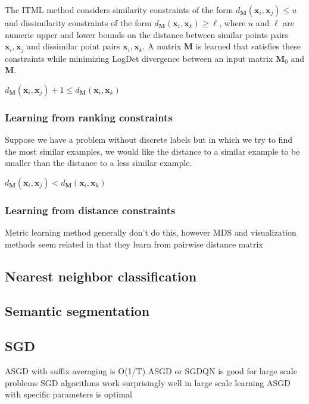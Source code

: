 \documentclass[a4paper,titlepage]{article}
\renewcommand{\vec}[1]{\mathbf{#1}}
\newcommand{\mat}[1]{\mathbf{#1}}
\begin{document}
The \acf{ITML} method \cite{davis2007information} considers similarity constraints of the form $d_{\mat{M}}(\vec{x}_{i}, \vec{x}_{j}) \leq u$ and dissimilarity constraints of the form $d_{\mat{M}}(\vec{x}_{i}, \vec{x}_{k}) \geq \ell$, where $u$ and $\ell$ are numeric upper and lower bounds on the distance between similar points pairs $\vec{x}_{i}, \vec{x}_{j}$ and dissimilar point pairs $\vec{x}_{i}, \vec{x}_{k}$. A matrix $\mat{M}$ is learned that satisfies these constraints while minimizing LogDet divergence between an input matrix $\mat{M}_0$ and $\mat{M}$.


$d_{\mat{M}}(\vec{x}_{i}, \vec{x}_{j}) + 1 \leq d_{\mat{M}}(\vec{x}_{i}, \vec{x}_{k})$
\subsubsection{Learning from ranking constraints}

Suppose we have a problem without discrete labels but in which we try to find the most similar examples, we would like the distance to a similar example to be smaller than the distance to a less similar example.

$d_{\mat{M}}(\vec{x}_{i}, \vec{x}_{j}) < d_{\mat{M}}(\vec{x}_{i}, \vec{x}_{k})$

\subsubsection{Learning from distance constraints}

Metric learning method generally don't do this, however MDS and visualization methods seem related in that they learn from pairwise distance matrix

\subsection{Nearest neighbor classification}

\subsection{Semantic segmentation}



\subsection{SGD}
 \cite{rakhlin2012making} ASGD with suffix averaging is O(1/T) \cite{bottou2010large} ASGD or SGDQN is good for large scale problems \cite{bottou2008tradeoffs} SGD algorithms work surprisingly well in large scale learning \cite{xu2011towards} ASGD with specific parameters is optimal
\end{document}
